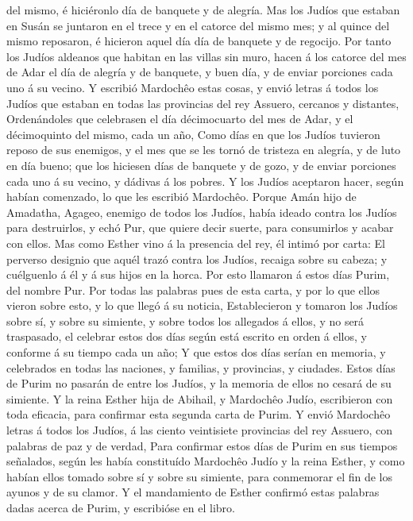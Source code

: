 del mismo, é hiciéronlo día de banquete y de alegría.  Mas
los Judíos que estaban en Susán se juntaron en el trece y en el catorce
del mismo mes; y al quince del mismo reposaron, é hicieron aquel día día
de banquete y de regocijo.  Por tanto los Judíos aldeanos
que habitan en las villas sin muro, hacen á los catorce del mes de Adar
el día de alegría y de banquete, y buen día, y de enviar porciones cada
uno á su vecino.  Y escribió Mardochêo estas cosas, y envió
letras á todos los Judíos que estaban en todas las provincias del rey
Assuero, cercanos y distantes,  Ordenándoles que celebrasen
el día décimocuarto del mes de Adar, y el décimoquinto del mismo, cada
un año,  Como días en que los Judíos tuvieron reposo de sus
enemigos, y el mes que se les tornó de tristeza en alegría, y de luto en
día bueno; que los hiciesen días de banquete y de gozo, y de enviar
porciones cada uno á su vecino, y dádivas á los pobres.  Y
los Judíos aceptaron hacer, según habían comenzado, lo que les escribió
Mardochêo.  Porque Amán hijo de Amadatha, Agageo, enemigo
de todos los Judíos, había ideado contra los Judíos para destruirlos, y
echó Pur, que quiere decir suerte, para consumirlos y acabar con ellos.
 Mas como Esther vino á la presencia del rey, él intimó por
carta: El perverso designio que aquél trazó contra los Judíos, recaiga
sobre su cabeza; y cuélguenlo á él y á sus hijos en la horca.
 Por esto llamaron á estos días Purim, del nombre Pur. Por
todas las palabras pues de esta carta, y por lo que ellos vieron sobre
esto, y lo que llegó á su noticia,  Establecieron y tomaron
los Judíos sobre sí, y sobre su simiente, y sobre todos los allegados á
ellos, y no será traspasado, el celebrar estos dos días según está
escrito en orden á ellos, y conforme á su tiempo cada un año;
 Y que estos dos días serían en memoria, y celebrados en
todas las naciones, y familias, y provincias, y ciudades. Estos días de
Purim no pasarán de entre los Judíos, y la memoria de ellos no cesará de
su simiente.  Y la reina Esther hija de Abihail, y
Mardochêo Judío, escribieron con toda eficacia, para confirmar esta
segunda carta de Purim.  Y envió Mardochêo letras á todos
los Judíos, á las ciento veintisiete provincias del rey Assuero, con
palabras de paz y de verdad,  Para confirmar estos días de
Purim en sus tiempos señalados, según les había constituído Mardochêo
Judío y la reina Esther, y como habían ellos tomado sobre sí y sobre su
simiente, para conmemorar el fin de los ayunos y de su clamor.
 Y el mandamiento de Esther confirmó estas palabras dadas
acerca de Purim, y escribióse en el libro.

